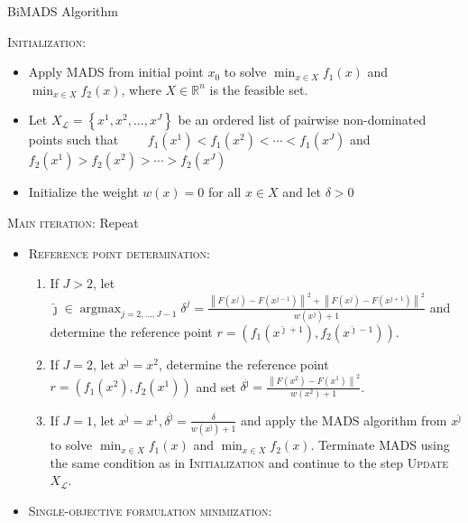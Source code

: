 \documentclass[11pt,oneside,onecolumn,openright]{article}
\begin{document}
    \begin{algorithm}[H]
      \caption{BiMADS Algorithm~\cite{audet2008multiobjective}}
      \begin{algorithmic}
      \State \textsc{Initialization}:
          \begin{itemize}
          \item Apply MADS from initial point $x_0$ to solve $\min _{x \in X} f_{1}(x)$ and $\min _{x \in X} f_{2}(x)$, where $X\in \mathbb{R}^n$ is the feasible set.
          \item Let $X_{\mathcal{L}}=\left\{x^{1}, x^{2}, \ldots, x^{J}\right\}$ be an ordered list of pairwise non-dominated points such that $\qquad f_{1}\left(x^{1}\right)<f_{1}\left(x^{2}\right)<\cdots<f_{1}\left(x^{J}\right)$ and $f_{2}\left(x^{1}\right)>f_{2}\left(x^{2}\right)>\cdots>f_{2}\left(x^{J}\right)$
          \item Initialize the weight $w(x)=0$ for all $x \in X$ and let $\delta>0$
      \end{itemize}
      \State \textsc{Main iteration}: Repeat
          \begin{itemize}
            \item \textsc{Reference point determination}:
              \begin{enumerate}[-]
                \item If $J>2$, let $\hat{\jmath} \in \operatorname{argmax}_{j=2, \ldots, J-1} \delta^{j}=\frac{\left\|F\left(x^{j}\right)-F\left(x^{j-1}\right)\right\|^{2}+\left\|F\left(x^{j}\right)-F\left(x^{j+1}\right)\right\|^{2}}{w\left(x^{j}\right)+1}$ and determine the reference point $r=\left(f_{1}\left(x^{\hat{\jmath}+1}\right), f_{2}\left(x^{\hat{\jmath}-1}\right)\right)$.
                \item If $J=2$, let $x^{\hat{\jmath}}=x^{2}$, determine the reference point $r=\left(f_{1}\left(x^{2}\right), f_{2}\left(x^{1}\right)\right)$ and set $\delta^{\hat{\jmath}}=\frac{\left\|F\left(x^{2}\right)-F\left(x^{1}\right)\right\|^{2}}{w\left(x^{2}\right)+1}$.
                \item If $J=1$, let $x^{\hat{\jmath}}=x^{1}, \delta^{\hat{\jmath}}=\frac{\delta}{w\left(x^{\hat{\jmath}}\right)+1}$ and apply the MADS algorithm from $x^{\hat{\jmath}}$ to solve $\min _{x \in X} f_{1}(x)$ and $\min _{x \in X} f_{2}(x)$. Terminate MADS using the same condition as in \textsc{Initialization} and continue to the step \textsc{Update} $X_{\mathcal{L}}$.
              \end{enumerate}          
            \item \textsc{Single-objective formulation minimization:}\label{sec:phi}

\end{itemize}
\end{algorithmic}
\end{algorithm}
\end{document}
